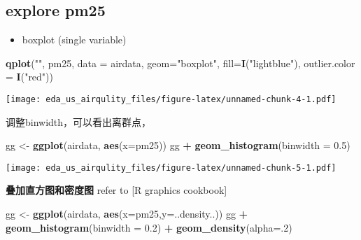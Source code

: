 \documentclass[]{article}
\newenvironment{Shaded}{\begin{snugshade}}{\end{snugshade}}
\newcommand{\KeywordTok}[1]{\textcolor[rgb]{0.13,0.29,0.53}{\textbf{#1}}}
\newcommand{\DataTypeTok}[1]{\textcolor[rgb]{0.13,0.29,0.53}{#1}}
\newcommand{\DecValTok}[1]{\textcolor[rgb]{0.00,0.00,0.81}{#1}}
\newcommand{\FloatTok}[1]{\textcolor[rgb]{0.00,0.00,0.81}{#1}}
\newcommand{\StringTok}[1]{\textcolor[rgb]{0.31,0.60,0.02}{#1}}
\newcommand{\OperatorTok}[1]{\textcolor[rgb]{0.81,0.36,0.00}{\textbf{#1}}}
\newcommand{\NormalTok}[1]{#1}
\providecommand{\tightlist}{%
  \setlength{\itemsep}{0pt}\setlength{\parskip}{0pt}}
\begin{document}
\subsection{explore pm25}\label{explore-pm25}

\begin{itemize}
\tightlist
\item
  boxplot (single variable)
\end{itemize}

\begin{Shaded}
\begin{Highlighting}[]
\KeywordTok{qplot}\NormalTok{(}\StringTok{""}\NormalTok{, pm25, }\DataTypeTok{data =}\NormalTok{ airdata, }\DataTypeTok{geom=}\StringTok{"boxplot"}\NormalTok{, }\DataTypeTok{fill=}\KeywordTok{I}\NormalTok{(}\StringTok{"lightblue"}\NormalTok{), }\DataTypeTok{outlier.color =} \KeywordTok{I}\NormalTok{(}\StringTok{"red"}\NormalTok{))}
\end{Highlighting}
\end{Shaded}

\texttt{[image: eda\_us\_airqulity\_files/figure-latex/unnamed-chunk-4-1.pdf]}

调整binwidth，可以看出离群点，

\begin{Shaded}
\begin{Highlighting}[]
\NormalTok{gg <-}\StringTok{ }\KeywordTok{ggplot}\NormalTok{(airdata, }\KeywordTok{aes}\NormalTok{(}\DataTypeTok{x=}\NormalTok{pm25))}
\NormalTok{gg }\OperatorTok{+}\StringTok{ }\KeywordTok{geom_histogram}\NormalTok{(}\DataTypeTok{binwidth =} \FloatTok{0.5}\NormalTok{)}
\end{Highlighting}
\end{Shaded}

\texttt{[image: eda\_us\_airqulity\_files/figure-latex/unnamed-chunk-5-1.pdf]}

\textbf{叠加直方图和密度图} refer to {[}R graphics cookbook{]}

\begin{Shaded}
\begin{Highlighting}[]
\NormalTok{gg <-}\StringTok{ }\KeywordTok{ggplot}\NormalTok{(airdata, }\KeywordTok{aes}\NormalTok{(}\DataTypeTok{x=}\NormalTok{pm25,}\DataTypeTok{y=}\NormalTok{..density..))}
\NormalTok{gg }\OperatorTok{+}\StringTok{ }\KeywordTok{geom_histogram}\NormalTok{(}\DataTypeTok{binwidth =} \FloatTok{0.2}\NormalTok{) }\OperatorTok{+}\StringTok{ }\KeywordTok{geom_density}\NormalTok{(}\DataTypeTok{alpha=}\NormalTok{.}\DecValTok{2}\NormalTok{)}
\end{Highlighting}
\end{Shaded}
\end{document}
